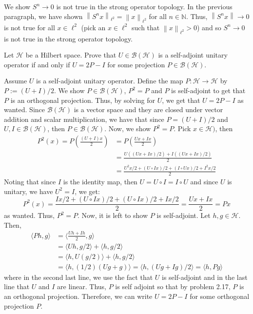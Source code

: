 \documentclass{article}
\newcommand{\norm}[1]{\left\lVert#1\right\rVert}
\begin{document}
\begin{Answer}
        We show $S^n \to 0$ is not true in the strong operator topology. In the previous paragraph, we have shown $\norm{S^n x}_{\ell^2} =
        \norm{x}_{\ell^2}$ for all $n\in\mathbb{N}$. Thus, $\norm{S^n x} \to 0$ is not true for all $x\in \ell^2$ (pick an $x\in\ell^2$
        such that $\norm{x}_{\ell^2} > 0$) and so $S^n\to 0$ is not true in the strong operator topology.
    \end{Answer}

    \newpage
    \begin{Exercise}
        Let $\mathscr{H}$ be a Hilbert space. Prove that $U\in\mathscr{B}(\mathscr{H})$ is a self-adjoint unitary operator if and only if
        $U = 2P-I$ for some projection $P\in\mathscr{B}(\mathscr{H})$.
    \end{Exercise}

    \begin{Answer}
        Assume $U$ is a self-adjoint unitary operator. Define the map $P:\mathscr{H}\to\mathscr{H}$ by $P := (U+I)/2$. We show
        $P\in\mathscr{B}(\mathscr{H})$, $P^2 = P$ and $P$ is self-adjoint to get that $P$ is an orthogonal projection. Thus, by solving
        for $U$, we get that $U = 2P - I$ as wanted. Since $\mathscr{B}(\mathscr{H})$ is a vector space and they are closed under
        vector addition and scalar multiplication, we have that since $P = (U+I)/2$ and $U,I\in\mathscr{B}(\mathscr{H})$, then
        $P\in\mathscr{B}(\mathscr{H})$. Now, we show $P^2 = P$. Pick $x\in\mathscr{H})$, then
        \begin{align*}
            P^2(x) = P(\frac{(U+I)x}{2}) &= P(\frac{Ux + Ix}{2}) \\
                &= \frac{U((Ux+Ix)/2) + I((Ux+Ix)/2)}{2} \\
                &= \frac{U^2x/2 + (U\circ Ix)/2 + (I\circ Ux)/2 + I^2x/2}{2}
        \end{align*}
        Noting that since $I$ is the identity map, then $U = U\circ I = I \circ U$ and since $U$ is unitary, we have $U^2 = I$, we get:
        \[ P^2(x) = \frac{Ix/2 + (U\circ Ix)/2 + (U\circ Ix)/2 + Ix/2}{2} = \frac{Ux + Ix}{2} = Px \]
        as wanted. Thus, $P^2 = P$. Now, it is left to show $P$ is self-adjoint. Let $h,g\in\mathscr{H}$. Then,
        \begin{align*}
            \langle Ph,g\rangle &= \langle \frac{Uh + Ih}{2},g\rangle \\
                &= \langle Uh,g/2\rangle + \langle h,g/2\rangle \\
                &= \langle h, U(g/2)\rangle + \langle h,g/2\rangle \\
                &= \langle h,(1/2)(Ug + g)\rangle = \langle h,(Ug+Ig)/2\rangle = \langle h,Pg\rangle
        \end{align*}
        where in the second last line, we use the fact that $U$ is self-adjoint and in the last line that $U$ and $I$ are linear. Thus,
        $P$ is self adjoint so that by problem 2.17, $P$ is an orthogonal projection. Therefore, we can write $U = 2P - I$ for some
        orthogonal projection $P$.\\


\end{Answer}
\end{document}
